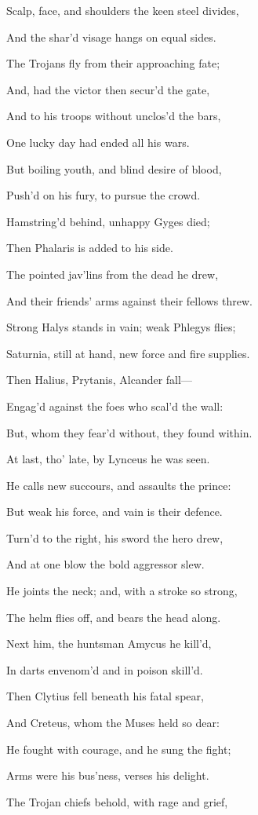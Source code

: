 Scalp, face, and shoulders the keen steel divides,

And the shar’d visage hangs on equal sides.

The Trojans fly from their approaching fate;

And, had the victor then secur’d the gate,

And to his troops without unclos’d the bars,

One lucky day had ended all his wars.

But boiling youth, and blind desire of blood,

Push’d on his fury, to pursue the crowd.

Hamstring’d behind, unhappy Gyges died;

Then Phalaris is added to his side.

The pointed jav’lins from the dead he drew,

And their friends’ arms against their fellows threw.

Strong Halys stands in vain; weak Phlegys flies;

Saturnia, still at hand, new force and fire supplies.

Then Halius, Prytanis, Alcander fall—

Engag’d against the foes who scal’d the wall:

But, whom they fear’d without, they found within.

At last, tho’ late, by Lynceus he was seen.

He calls new succours, and assaults the prince:

But weak his force, and vain is their defence.

Turn’d to the right, his sword the hero drew,

And at one blow the bold aggressor slew.

He joints the neck; and, with a stroke so strong,

The helm flies off, and bears the head along.

Next him, the huntsman Amycus he kill’d,

In darts envenom’d and in poison skill’d.

Then Clytius fell beneath his fatal spear,

And Creteus, whom the Muses held so dear:

He fought with courage, and he sung the fight;

Arms were his bus’ness, verses his delight.

The Trojan chiefs behold, with rage and grief,

